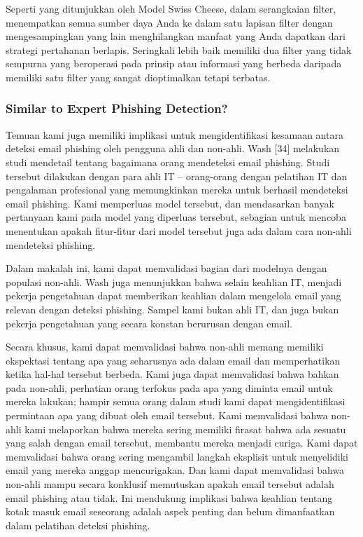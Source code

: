 \documentclass[lettersize,journal]{IEEEtran}
\begin{document}
Seperti yang ditunjukkan oleh Model Swiss Cheese, dalam serangkaian filter,
menempatkan semua sumber daya Anda ke dalam satu lapisan filter dengan
mengesampingkan yang lain menghilangkan manfaat yang Anda dapatkan dari
strategi pertahanan berlapis. Seringkali lebih baik memiliki dua filter yang
tidak sempurna yang beroperasi pada prinsip atau informasi yang berbeda
daripada memiliki satu filter yang sangat dioptimalkan tetapi terbatas.

\subsubsection{Similar to Expert Phishing Detection?}

Temuan kami juga memiliki implikasi untuk mengidentifikasi kesamaan antara
deteksi email phishing oleh pengguna ahli dan non-ahli. Wash [34] melakukan
studi mendetail tentang bagaimana orang mendeteksi email phishing. Studi
tersebut dilakukan dengan para ahli IT – orang-orang dengan pelatihan IT dan
pengalaman profesional yang memungkinkan mereka untuk berhasil mendeteksi email
phishing. Kami memperluas model tersebut, dan mendasarkan banyak pertanyaan
kami pada model yang diperluas tersebut, sebagian untuk mencoba menentukan
apakah fitur-fitur dari model tersebut juga ada dalam cara non-ahli mendeteksi
phishing.

Dalam makalah ini, kami dapat memvalidasi bagian dari modelnya dengan populasi
non-ahli. Wash juga menunjukkan bahwa selain keahlian IT, menjadi pekerja
pengetahuan dapat memberikan keahlian dalam mengelola email yang relevan dengan
deteksi phishing. Sampel kami bukan ahli IT, dan juga bukan pekerja pengetahuan
yang secara konstan berurusan dengan email.

Secara khusus, kami dapat memvalidasi bahwa non-ahli memang memiliki ekspektasi
tentang apa yang seharusnya ada dalam email dan memperhatikan ketika hal-hal
tersebut berbeda. Kami juga dapat memvalidasi bahwa bahkan pada non-ahli,
perhatian orang terfokus pada apa yang diminta email untuk mereka lakukan;
hampir semua orang dalam studi kami dapat mengidentifikasi permintaan apa yang
dibuat oleh email tersebut. Kami memvalidasi bahwa non-ahli kami melaporkan
bahwa mereka sering memiliki firasat bahwa ada sesuatu yang salah dengan email
tersebut, membantu mereka menjadi curiga. Kami dapat memvalidasi bahwa orang
sering mengambil langkah eksplisit untuk menyelidiki email yang mereka anggap
mencurigakan. Dan kami dapat memvalidasi bahwa non-ahli mampu secara konklusif
memutuskan apakah email tersebut adalah email phishing atau tidak. Ini
mendukung implikasi bahwa keahlian tentang kotak masuk email seseorang adalah
aspek penting dan belum dimanfaatkan dalam pelatihan deteksi phishing.
\end{document}
